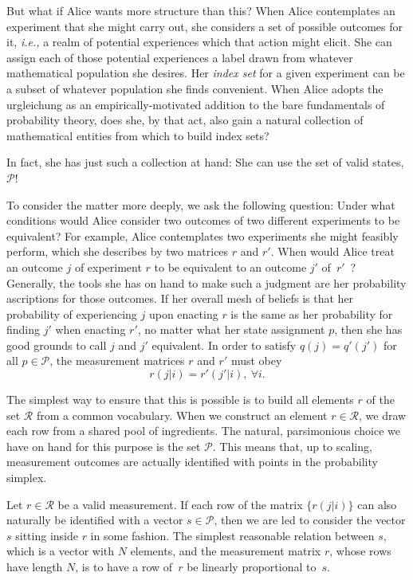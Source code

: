 \documentclass[aps,pra,superscriptaddress,10pt,tightenlines,twocolumn,nofootinbib]{revtex4}
\theoremstyle{remark}
\newcommand{\cP}{\mathcal{P}}
\newcommand{\cR}{\mathcal{R}}
\begin{document}
But what if Alice wants more structure than this?  When Alice
contemplates an experiment that she might carry out, she considers a
set of possible outcomes for it, \emph{i.e.,} a realm of potential
experiences which that action might elicit.  She can assign each of
those potential experiences a label drawn from whatever mathematical
population she desires.  Her \emph{index set} for a given experiment
can be a subset of whatever population she finds convenient.  When
Alice adopts the urgleichung as an empirically-motivated addition to
the bare fundamentals of probability theory, does she, by that act,
also gain a natural collection of mathematical entities from which to
build index sets?

In fact, she has just such a collection at hand: She can use the set
of valid states, $\cP$!

To consider the matter more deeply, we ask the following question:
Under what conditions would Alice consider two outcomes of two
different experiments to be equivalent?  For example, Alice
contemplates two experiments she might feasibly perform, which she
describes by two matrices $r$ and $r'$.  When would Alice treat an
outcome $j$ of experiment $r$ to be equivalent to an outcome $j'$
of~$r'$~\cite{fuchs2002}? Generally, the tools she has on hand to make
such a judgment are her probability ascriptions for those outcomes.
If her overall mesh of beliefs is that her probability of experiencing
$j$ upon enacting $r$ is the same as her probability for finding $j'$
when enacting $r'$, no matter what her state assignment ${p}$,
then she has good grounds to call $j$ and $j'$ equivalent.  In order
to satisfy $q(j) = q'(j')$ for all $p \in \cP$, the measurement
matrices $r$ and $r'$ must obey
\begin{equation}
r(j|i) = r'(j'|i),\ \forall i.
\end{equation}

The simplest way to ensure that this is possible is to build all
elements $r$ of the set $\cR$ from a common vocabulary.  When we
construct an element $r \in \cR$, we draw each row from a shared pool
of ingredients.  The natural, parsimonious choice we have on hand for
this purpose is the set $\cP$.  This means that, up to scaling,
measurement outcomes are actually identified with points in the
probability simplex.

Let $r \in \cR$ be a valid measurement.  If each row of the matrix
$\{r(j|i)\}$ can also naturally be identified with a vector ${s} \in
\cP$, then we are led to consider the vector ${s}$ sitting inside $r$
in some fashion.  The simplest reasonable relation between ${s}$,
which is a vector with $N$ elements, and the measurement matrix $r$,
whose rows have length $N$, is to have a row of~$r$ be linearly
proportional to~${s}$.
\end{document}
